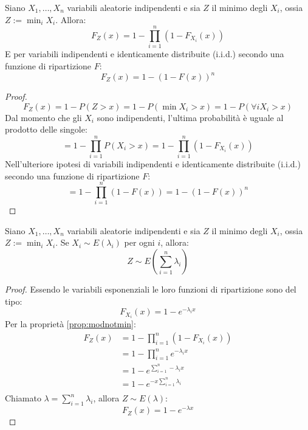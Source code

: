 \begin{prop} \label{prop:modnotmin}
	Siano $X_1,\dots,X_n$ variabili aleatorie indipendenti e sia $Z$ il minimo degli $X_i$, ossia $Z:=\min_i X_i$. Allora:
	\begin{equation*}
		F_Z(x) = 1 - \prod_{i=1}^n (1-F_{X_i}(x))
	\end{equation*}
	E per variabili indipendenti e identicamente distribuite (i.i.d.) secondo una funzione di ripartizione $F$:
	\begin{equation*}
		F_Z(x) = 1 - (1-F(x))^n
	\end{equation*}
\end{prop}
\begin{proof}
	\begin{equation*}
		F_Z(x) = 1 - P(Z>x) = 1 - P(\min X_i > x) = 1 - P(\forall i X_i > x)
	\end{equation*}
	Dal momento che gli $X_i$ sono indipendenti, l'ultima probabilità è uguale al prodotto delle singole:
	\begin{equation*}
		= 1 - \prod_{i=1}^n P(X_i > x) = 1 - \prod_{i=1}^n (1-F_{X_i}(x))
	\end{equation*}
	Nell'ulteriore ipotesi di variabili indipendenti e identicamente distribuite (i.i.d.) secondo una funzione di ripartizione $F$:
	\begin{equation*}
		= 1 - \prod_{i=1}^n (1-F(x)) = 1 - (1-F(x))^n
	\end{equation*}
\end{proof}

\begin{prop}
	Siano $X_1,\dots,X_n$ variabili aleatorie indipendenti e sia $Z$ il minimo degli $X_i$, ossia $Z:=\min_i X_i$. Se $X_i\sim E(\lambda_i)$ per ogni $i$, allora:
	\begin{equation*}
		Z\sim E\left(\sum_{i=1}^n \lambda_i\right)
	\end{equation*}
\end{prop}
\begin{proof}
	Essendo le variabili esponenziali le loro funzioni di ripartizione sono del tipo:
	\begin{equation*}
		F_{X_i}(x) = 1-e^{-\lambda_i x}
	\end{equation*}
	Per la proprietà \ref{prop:modnotmin}:
	\begin{align*}
		F_Z(x) & = 1 - \prod_{i=1}^n (1-F_{X_i}(x))   \\
		       & = 1 - \prod_{i=1}^n e^{-\lambda_i x} \\
		       & = 1 - e^{\sum_{i=1}^n -\lambda_i x}  \\
		       & = 1 - e^{-x \sum_{i=1}^n \lambda_i}  \\
	\end{align*}
	Chiamato $\lambda = \sum_{i=1}^n \lambda_i$, allora $Z\sim E(\lambda)$:
	\begin{equation*}
		F_Z(x) = 1 - e^{-\lambda x}
	\end{equation*}
\end{proof}

